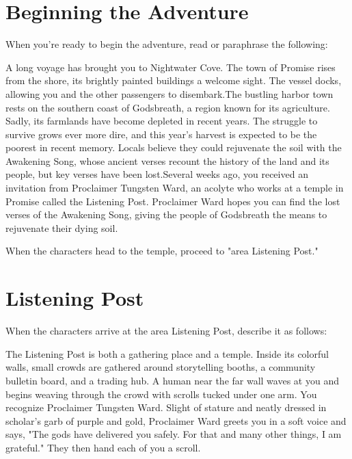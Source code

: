 \documentclass[letterpaper, 11pt, twocolumn]{dndbook}
\begin{document}
\section{Beginning the Adventure}

When you're ready to begin the adventure, read or paraphrase the following:

\begin{DndReadAloud}
A long voyage has brought you to Nightwater Cove. The town of Promise rises from the shore, its brightly painted buildings a welcome sight. The vessel docks, allowing you and the other passengers to disembark.The bustling harbor town rests on the southern coast of Godsbreath, a region known for its agriculture. Sadly, its farmlands have become depleted in recent years. The struggle to survive grows ever more dire, and this year's harvest is expected to be the poorest in recent memory. Locals believe they could rejuvenate the soil with the Awakening Song, whose ancient verses recount the history of the land and its people, but key verses have been lost.Several weeks ago, you received an invitation from Proclaimer Tungsten Ward, an acolyte who works at a temple in Promise called the Listening Post. Proclaimer Ward hopes you can find the lost verses of the Awakening Song, giving the people of Godsbreath the means to rejuvenate their dying soil.
\end{DndReadAloud}

When the characters head to the temple, proceed to "area Listening Post."
\section{Listening Post}

When the characters arrive at the area Listening Post, describe it as follows:

\begin{DndReadAloud}
The Listening Post is both a gathering place and a temple. Inside its colorful walls, small crowds are gathered around storytelling booths, a community bulletin board, and a trading hub. A human near the far wall waves at you and begins weaving through the crowd with scrolls tucked under one arm. You recognize Proclaimer Tungsten Ward. Slight of stature and neatly dressed in scholar's garb of purple and gold, Proclaimer Ward greets you in a soft voice and says, "The gods have delivered you safely. For that and many other things, I am grateful." They then hand each of you a scroll.
\end{DndReadAloud}
\end{document}
